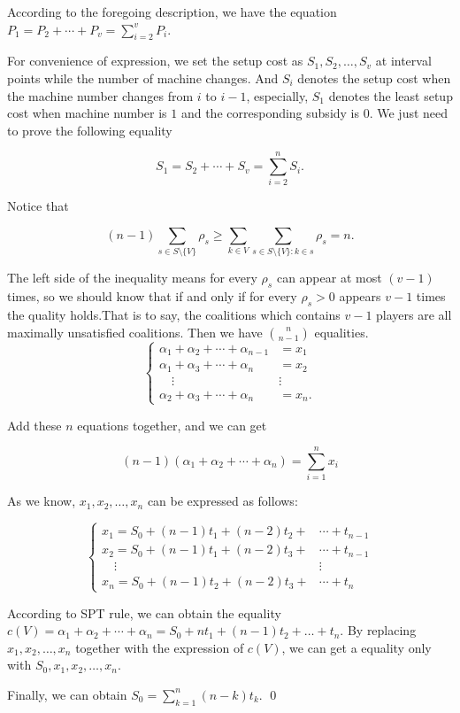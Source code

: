 \begin{pf}[Theorem 2]

According to the foregoing description, we have the equation $P_{1}=P_{2}+\cdots+P_{v}=\sum_{i=2}^v P_i$.

For convenience of expression, we set the setup cost as $S_{1},S_{2}, \dots ,S_{v}$ at interval points while the number of machine changes.
And $S_{i}$ denotes the setup cost when the machine number changes from $i$ to $i-1$, especially, $S_{1}$ denotes the least setup cost when machine number is $1$ and the corresponding subsidy is $0$.
We just need to prove the following equality

\begin{displaymath}
  S_{1}=S_{2}+\cdots+S_{v}=\sum_{i=2}^n S_i.
\end{displaymath}

Notice that

\begin{displaymath}
  (n-1) \sum_{s \in S \setminus\{V\} } \rho_s \geq
  \sum_{k\in V}\sum_{s \in S \setminus\{V\}:k \in s} \rho_s = n.
\end{displaymath}

The left side of the inequality means for every $\rho_s$ can appear at most $(v-1)$ times, so we should know that if and only if for every $\rho_s > 0$ appears $v-1$ times the quality holds.That is to say, the coalitions which contains $v-1$ players are all maximally unsatisfied coalitions. Then we have $n \choose n-1$ equalities.
\[
\begin{cases}
 \alpha_1+\alpha_2+ \cdots+\alpha_{n-1} & = x_1 \\
 \alpha_1+\alpha_3+ \cdots+\alpha_n & = x_2 \\
 \quad   \vdots        &\vdots\\
 \alpha_2+\alpha_3+ \cdots+\alpha_n & = x_n.
\end{cases}
\]

Add these $n$ equations together, and we can get

\begin{equation*}
  (n-1)(\alpha_1+\alpha_2+ \cdots+\alpha_n)=\sum_{i=1}^{n}x_i
\end{equation*}

As we know, $x_1,x_2,\dots,x_n$ can be expressed as follows:

\[
\begin{cases}
x_1 = S_0 + (n-1)t_1 + (n-2)t_2 + &\cdots + t_{n-1} \\
x_2 = S_0 + (n-1)t_1 + (n-2)t_3 + &\cdots + t_{n-1} \\
\quad   \vdots        &\vdots\\
x_n = S_0 + (n-1)t_2 + (n-2)t_3 + &\cdots + t_{n}
\end{cases}
\]

According to SPT rule, we can obtain the equality
$c(V)=\alpha_1+\alpha_2+\cdots+\alpha_n=S_0+nt_1+(n-1)t_2+\dots+t_n$.
By replacing $x_1,x_2,\dots,x_n$ together with the expression of $c(V)$, we can get a equality only with $S_0,x_1,x_2,\dots,x_n$.

Finally, we can obtain $S_0 = \sum_{k=1}^n (n-k)t_k$.
\qed
\end{pf}

